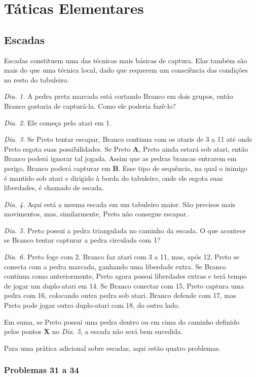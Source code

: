 \chapter{Táticas Elementares}

\section{Escadas}

Escadas constituem uma das técnicas mais básicas de captura. Elas também são mais do que uma técnica local, dado que requerem um consciência das condições no resto do tabuleiro.

\emph{Dia. 1.} A pedra preta marcada está cortando Branco em dois grupos, então Branco gostaria de capturá-la. Como ele poderia fazê-lo?

\emph{Dia. 2.} Ele começa pelo atari em 1.

\emph{Dia. 3.} Se Preto tentar escapar, Branco continua com os ataris de 3 a 11 até onde Preto esgota suas possibilidades. Se Preto \textbf{A}, Preto ainda estará sob atari, então Branco poderá ignorar tal jogada. Assim que as pedras brancas entrarem em perigo, Branco poderá capturar em \textbf{B}. Esse tipo de sequência, na qual o inimigo é mantido sob atari e dirigido à borda do tabuleiro, onde ele esgota suas liberdades, é chamado de escada.

\emph{Dia. 4.} Aqui está a mesma escada em um tabuleiro maior. São precisos mais movimentos, mas, similarmente, Preto não consegue escapar.

\emph{Dia. 5.} Preto possui a pedra triangulada no caminho da escada. O que acontece se Branco tentar capturar a pedra circulada com 1?

\emph{Dia. 6.} Preto foge com 2. Branco faz atari com 3 a 11, mas, após 12, Preto se conecta com a pedra marcada, ganhando uma liberdade extra. Se Branco continua como anteriormente, Preto agora possui liberdades extras e terá tempo de jogar um duplo-atari em 14. Se Branco conectar com 15, Preto captura uma pedra com 16, colocando outra pedra sob atari. Branco defende com 17, mas Preto pode jogar outro duplo-atari com 18, do outro lado.

Em suma, se Preto possui uma pedra dentro ou em cima do caminho definido pelos pontos \textbf{X} no \emph{Dia. 5}, a escada não será bem sucedida.

Para uma prática adicional sobre escadas, aqui estão quatro problemas.

\subsection{Problemas 31 a 34}

